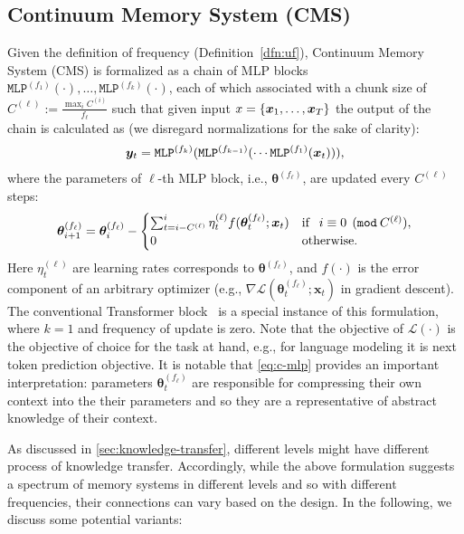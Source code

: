 {\subsection{Continuum Memory System (CMS)}
Given the definition of frequency (Definition~\ref{dfn:uf}), Continuum Memory System (CMS) is formalized as a chain of MLP blocks $\texttt{MLP}^{(f_1)}(\cdot), \dots, \texttt{MLP}^{(f_k)}(\cdot)$, each of which associated with a chunk size of $C^{(\ell)} := \frac{\max_{i} C^{(i)}}{f_{\ell}}$ such that given input $x = \{\boldsymbol{x}_1, \dots, \boldsymbol{x}_T\}$ the output of the chain is calculated as (we disregard normalizations for the sake of clarity):
\begin{align}\label{eq:output-cms}
    \boldsymbol{y}_t = \texttt{MLP}^{(f_k)}(\texttt{MLP}^{(f_{k-1})}(\cdots \texttt{MLP}^{(f_1)}(\boldsymbol{x}_t))), 
\end{align}
where the parameters of $\ell$-th MLP block, i.e., $\boldsymbol{\theta}^{(f_{\ell})}$, are updated every $C^{(\ell)}$ steps:
\begin{align}\label{eq:c-mlp}
    \boldsymbol{\theta}^{(f_{\ell})}_{i+1} =  \boldsymbol{\theta}^{(f_{\ell})}_i - \begin{cases} \sum_{t = i - C^{(\ell)}}^{i}\eta^{(\ell)}_t f(\boldsymbol{\theta}^{(f_{\ell})}_{t}; \boldsymbol{x}_{t}) & \text{if \:\:} i \equiv 0 \:\: (\texttt{mod} \: C^{(\ell)}), \\ 0 & \text{otherwise}.
    \end{cases}
\end{align}
 Here $\eta^{(\ell)}_t$ are learning rates corresponds to $\boldsymbol{\theta}^{(f_{\ell})}$, and $f(\cdot)$ is the error component of an arbitrary optimizer (e.g., $\nabla \mathcal{L}(\boldsymbol{\theta}^{(f_{\ell})}_{t}; \boldsymbol{x}_t)$ in gradient descent). The conventional Transformer block~\citep{transformers} is a special instance of this formulation, where $k = 1$ and frequency of update is zero. Note that the objective of $\mathcal{L}(\cdot)$ is the objective of choice for the task at hand, e.g., for language modeling it is next token prediction objective. It is notable that \autoref{eq:c-mlp} provides an important interpretation: parameters $\boldsymbol{\theta}^{(f_{\ell})}_{t}$ are responsible for compressing their own context into the their parameters and so they are a representative of abstract knowledge of their context.

As discussed in \autoref{sec:knowledge-transfer}, different levels might have different process of knowledge transfer. Accordingly, while the above formulation suggests a spectrum of memory systems in different levels and so with different frequencies, their connections can vary based on the design. In the following, we discuss some potential variants:

}
